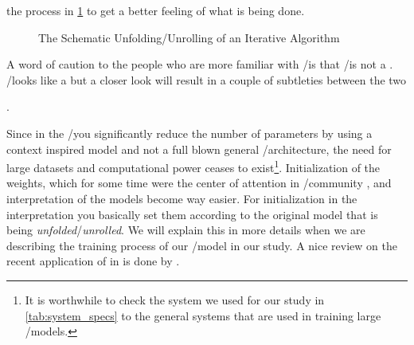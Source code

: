 the process in \cref{fig:deep_unfolding_unrolling} to get a better feeling of what is being done. 
\begin{figure}
  \centering
	\captionsetup{justification=centering}
  \resizebox{35em}{10em}{}
  \caption{The Schematic Unfolding/Unrolling of an Iterative Algorithm}
  \label{fig:deep_unfolding_unrolling}
\end{figure}

A word of caution to the people who are more familiar with \ml/\dl is that \du/\au is not a \rnn\cite{Gregor2010}. \DU/\AU looks like a \rnn\cite{Gregor2010} but 
a closer look will result in a couple of subtleties between the two

. 


Since in the \du/\au you significantly reduce the number of 
parameters by using a context inspired model and not a full blown general \ml/\dl architecture, the need for large 
datasets and computational power ceases to exist\footnote{It is worthwhile to check the system we used for our 
study in \cref{tab:system_specs} to the general systems\cite{Meuer} that are used in training large \ml/\dl models.}. Initialization 
of the weights, which for some time were the center of attention in \ml/\dl community \cite{Glorot2010}\cite{He2015a}, 
and interpretation of the models become way easier. For initialization in the \du interpretation you basically set them according 
to the original model that is being \emph{unfolded}/\emph{unrolled}. We will explain this in more details when we are describing the 
training process of our \ml/\dl model in our study. A nice review on the recent application of \du in \dsip is done by \cite{Monga2019}.











